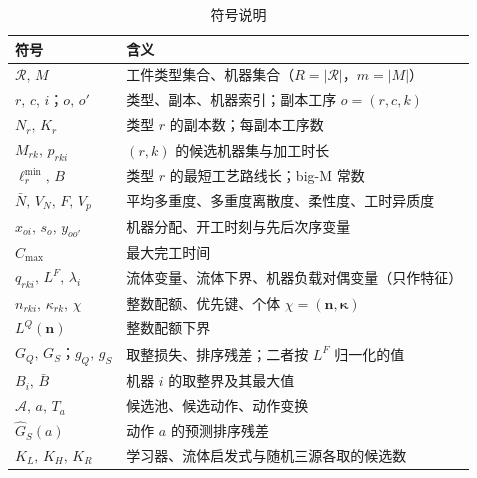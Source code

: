 \begin{table}[htbp]
\centering\small
\caption{符号说明}\label{tab:notation}
\begin{tabularx}{\linewidth}{@{}>{\hsize}L>{\hsize}L@{}}
\toprule
\textbf{符号} & \textbf{含义} \\
\midrule
$\mathcal{R},\,M$ & 工件类型集合、机器集合（$R = \lvert\mathcal{R}\rvert$，$m = \lvert M\rvert$） \\
$r,\,c,\,i$；$o,\,o'$ & 类型、副本、机器索引；副本工序 $o = (r,c,k)$ \\
$N_r,\,K_r$ & 类型 $r$ 的副本数；每副本工序数 \\
$M_{rk},\,p_{rki}$ & $(r,k)$ 的候选机器集与加工时长 \\
$\ell_r^{\min},\,B$ & 类型 $r$ 的最短工艺路线长；big-M 常数 \\
$\bar N,\,V_N,\,F,\,V_p$ & 平均多重度、多重度离散度、柔性度、工时异质度 \\
$x_{oi},\,s_o,\,y_{oo'}$ & 机器分配、开工时刻与先后次序变量 \\
$C_{\max}$ & 最大完工时间 \\
$q_{rki},\,L^F,\,\lambda_i$ & 流体变量、流体下界、机器负载对偶变量（只作特征） \\
$n_{rki},\,\kappa_{rk},\,\chi$ & 整数配额、优先键、个体 $\chi = (\mathbf{n}, \boldsymbol{\kappa})$ \\
$L^Q(\mathbf{n})$ & 整数配额下界 \\
$G_Q,\,G_S$；$g_Q,\,g_S$ & 取整损失、排序残差；二者按 $L^F$ 归一化的值 \\
$B_i,\,\bar B$ & 机器 $i$ 的取整界及其最大值 \\
$\mathcal{A},\,a,\,T_a$ & 候选池、候选动作、动作变换 \\
$\hat G_S(a)$ & 动作 $a$ 的预测排序残差 \\
$K_L,\,K_H,\,K_R$ & 学习器、流体启发式与随机三源各取的候选数 \\
\bottomrule
\end{tabularx}
\end{table}

